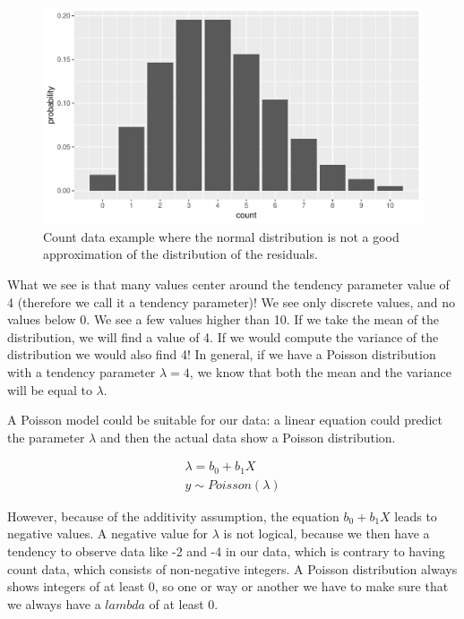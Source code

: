 \documentclass[]{book}\usepackage[]{graphicx}\usepackage[]{color}
\makeatletter
\def\maxwidth{ %
  \ifdim\Gin@nat@width>\linewidth
    \linewidth
  \else
    \Gin@nat@width
  \fi
}
\newenvironment{knitrout}{}{} %
\makeatother
\begin{document}
\begin{knitrout}
\color{fgcolor}\begin{figure}

{\centering \includegraphics[width=\maxwidth]{figure/gen_15-1} 

}

\caption[Count data example where the normal distribution is not a good approximation of the distribution of the residuals]{Count data example where the normal distribution is not a good approximation of the distribution of the residuals.}\label{fig:gen_15}
\end{figure}


\end{knitrout}

What we see is that many values center around the tendency parameter value of 4 (therefore we call it a tendency parameter)! We see only discrete values, and no values below 0. We see a few values higher than 10. If we take the mean of the distribution, we will find a value of 4. If we would compute the variance of the distribution we would also find 4! In general, if we have a Poisson distribution with a tendency parameter $\lambda=4$, we know that both the mean and the variance will be equal to $\lambda$.

A Poisson model could be suitable for our data: a linear equation could predict the parameter $\lambda$ and then the actual data show a Poisson distribution.


\begin{eqnarray}
\lambda = b_0 + b_1 X \\
y \sim Poisson(\lambda)
\end{eqnarray}

However, because of the additivity assumption, the equation $b_0 + b_1 X$ leads to negative values. A negative value for $\lambda$ is not logical, because we then have a tendency to observe data like -2 and -4 in our data, which is contrary to having count data, which consists of non-negative integers. A Poisson distribution always shows integers of at least 0, so one or way or another we have to make sure that we always have a $lambda$ of at least 0.
\end{document}
